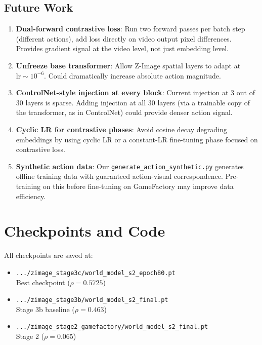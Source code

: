\documentclass[10pt,twocolumn]{article}
\begin{document}
\subsection{Future Work}

\begin{enumerate}
  \item \textbf{Dual-forward contrastive loss}: Run two forward passes per batch step (different actions), add loss directly on video output pixel differences. Provides gradient signal at the video level, not just embedding level.
  \item \textbf{Unfreeze base transformer}: Allow Z-Image spatial layers to adapt at $\text{lr} \sim 10^{-6}$. Could dramatically increase absolute action magnitude.
  \item \textbf{ControlNet-style injection at every block}: Current injection at 3 out of 30 layers is sparse. Adding injection at all 30 layers (via a trainable copy of the transformer, as in ControlNet) could provide denser action signal.
  \item \textbf{Cyclic LR for contrastive phases}: Avoid cosine decay degrading embeddings by using cyclic LR or a constant-LR fine-tuning phase focused on contrastive loss.
  \item \textbf{Synthetic action data}: Our \texttt{generate\_action\_synthetic.py} generates offline training data with guaranteed action-visual correspondence. Pre-training on this before fine-tuning on GameFactory may improve data efficiency.
\end{enumerate}

\section{Checkpoints and Code}

All checkpoints are saved at:
\begin{itemize}
  \item \texttt{.../zimage\_stage3c/world\_model\_s2\_epoch80.pt}\\
        Best checkpoint ($\rho=0.5725$)
  \item \texttt{.../zimage\_stage3b/world\_model\_s2\_final.pt}\\
        Stage 3b baseline ($\rho=0.463$)
  \item \texttt{.../zimage\_stage2\_gamefactory/world\_model\_s2\_final.pt}\\
        Stage 2 ($\rho=0.065$)
\end{itemize}
\end{document}
